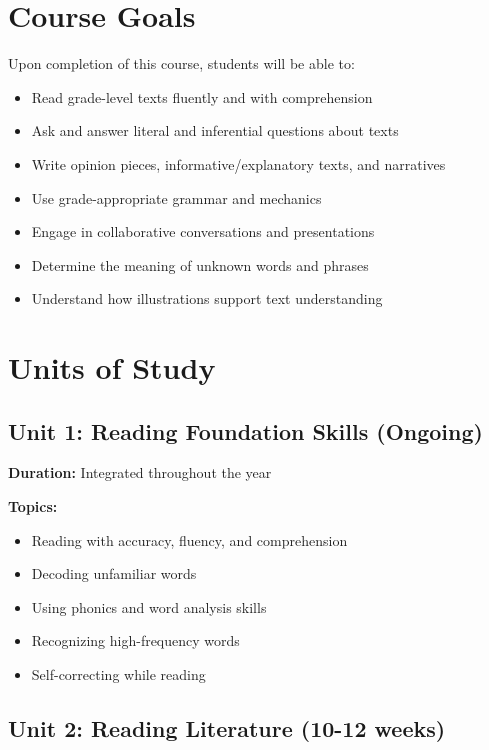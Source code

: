 \documentclass[11pt,letterpaper]{report}
\begin{document}
\section{Course Goals}

Upon completion of this course, students will be able to:

\begin{itemize}
    \item Read grade-level texts fluently and with comprehension
    \item Ask and answer literal and inferential questions about texts
    \item Write opinion pieces, informative/explanatory texts, and narratives
    \item Use grade-appropriate grammar and mechanics
    \item Engage in collaborative conversations and presentations
    \item Determine the meaning of unknown words and phrases
    \item Understand how illustrations support text understanding
\end{itemize}

\section{Units of Study}

\subsection{Unit 1: Reading Foundation Skills (Ongoing)}

\textbf{Duration:} Integrated throughout the year

\textbf{Topics:}
\begin{itemize}
    \item Reading with accuracy, fluency, and comprehension
    \item Decoding unfamiliar words
    \item Using phonics and word analysis skills
    \item Recognizing high-frequency words
    \item Self-correcting while reading
\end{itemize}

\subsection{Unit 2: Reading Literature (10-12 weeks)}
\end{document}
